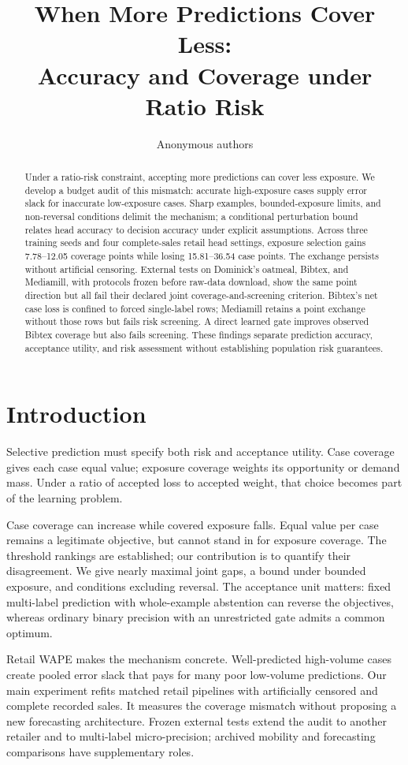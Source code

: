 \documentclass{article}
\title{When More Predictions Cover Less:\\Accuracy and Coverage under Ratio Risk}
\author{Anonymous authors}
\begin{document}
\maketitle
\begin{abstract}
Under a ratio-risk constraint, accepting more predictions can cover less exposure. We develop a budget audit of this mismatch: accurate high-exposure cases supply error slack for inaccurate low-exposure cases. Sharp examples, bounded-exposure limits, and non-reversal conditions delimit the mechanism; a conditional perturbation bound relates head accuracy to decision accuracy under explicit assumptions. Across three training seeds and four complete-sales retail head settings, exposure selection gains 7.78--12.05 coverage points while losing 15.81--36.54 case points. The exchange persists without artificial censoring. External tests on Dominick's oatmeal, Bibtex, and Mediamill, with protocols frozen before raw-data download, show the same point direction but all fail their declared joint coverage-and-screening criterion. Bibtex's net case loss is confined to forced single-label rows; Mediamill retains a point exchange without those rows but fails risk screening. A direct learned gate improves observed Bibtex coverage but also fails screening. These findings separate prediction accuracy, acceptance utility, and risk assessment without establishing population risk guarantees.
\end{abstract}

\section{Introduction}
Selective prediction must specify both risk and acceptance utility. Case coverage gives each case equal value; exposure coverage weights its opportunity or demand mass. Under a ratio of accepted loss to accepted weight, that choice becomes part of the learning problem.

Case coverage can increase while covered exposure falls. Equal value per case remains a legitimate objective, but cannot stand in for exposure coverage. The threshold rankings are established; our contribution is to quantify their disagreement. We give nearly maximal joint gaps, a bound under bounded exposure, and conditions excluding reversal. The acceptance unit matters: fixed multi-label prediction with whole-example abstention can reverse the objectives, whereas ordinary binary precision with an unrestricted gate admits a common optimum.

Retail WAPE makes the mechanism concrete. Well-predicted high-volume cases create pooled error slack that pays for many poor low-volume predictions. Our main experiment refits matched retail pipelines with artificially censored and complete recorded sales. It measures the coverage mismatch without proposing a new forecasting architecture. Frozen external tests extend the audit to another retailer and to multi-label micro-precision; archived mobility and forecasting comparisons have supplementary roles.
\end{document}
